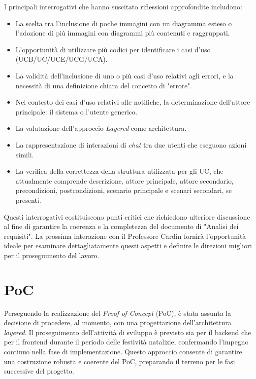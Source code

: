 I principali interrogativi che hanno suscitato riflessioni approfondite includono:

\begin{itemize}
	\item La scelta tra l'inclusione di poche immagini con un diagramma esteso o l'adozione di più immagini con diagrammi più contenuti e raggruppati.
	\item L'opportunità di utilizzare più codici per identificare i casi d'uso (UCB/UC/UCE/UCG/UCA).
	\item La validità dell'inclusione di uno o più casi d'uso relativi agli errori, e la necessità di una definizione chiara del concetto di "errore".
	\item Nel contesto dei casi d'uso relativi alle notifiche, la determinazione dell'attore principale: il sistema o l'utente generico.
	\item La valutazione dell'approccio \textit{Layered} come architettura.
	\item La rappresentazione di interazioni di \textit{chat} tra due utenti che eseguono azioni simili.
	\item La verifica della correttezza della struttura utilizzata per gli UC, che attualmente comprende descrizione,
	      attore principale, attore secondario, precondizioni, postcondizioni, scenario principale e scenari secondari, se presenti.
\end{itemize}

Questi interrogativi costituiscono punti critici che richiedono ulteriore discussione al fine di garantire la coerenza
e la completezza del documento di "Analisi dei requisiti".
La prossima interazione con il Professore Cardin fornirà l'opportunità ideale per esaminare dettagliatamente questi aspetti
e definire le direzioni migliori per il proseguimento del lavoro.



\section{PoC}
Perseguendo la realizzazione del \textit{Proof of Concept} (PoC), è stata assunta la decisione di procedere, al momento, con una progettazione dell'architettura
\textit{layered}.
Il proseguimento dell'attività di sviluppo è previsto sia per il backend che per il frontend durante il periodo delle festività natalizie,
confermando l'impegno continuo nella fase di implementazione.
Questo approccio consente di garantire una costruzione robusta e coerente del PoC, preparando il terreno per le fasi successive del progetto.


